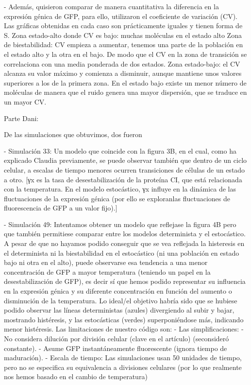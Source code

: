 - Además, quisieron comparar de manera cuantitativa la diferencia en la expresión génica de GFP, para ello, utilizaron el coeficiente de variación (CV). Las gráficas obtenidas en cada caso son prácticamente iguales y tienen forma de S. 
	Zona estado-alto donde CV es bajo: muchas moléculas en el estado alto 
	Zona de biestabilidad: CV empieza a aumentar, tenemos una parte de la población en el estado alto y la otra en el bajo. De modo que el CV en la zona de transición se correlaciona con una media ponderada de dos estados.
	Zona estado-bajo: el CV alcanza su valor máximo y comienza a disminuir, aunque mantiene unos valores superiores a los de la primera zona. En el estado bajo existe un menor número de moléculas de manera que el ruido genera una mayor dispersión, que se traduce en un mayor CV.


Parte Dani:

De las simulaciones que obtuvimos, dos fueron

- Simulación 33: Un modelo que coincide con la figura 3B, en el cual, como ha explicado Claudia previamente, se puede observar también que dentro de un ciclo celular, a escalas de tiempo menores ocurren transiciones de células de un estado a otro.
	[γx es la tasa de desestabilización de la proteína CI, que está relacionada con la temperatura. En el modelo estocástico, γx influye en la dinámica de las fluctuaciones de la expresión génica (por ello se exploranlas fluctuaciones de  fluorescencia de GFP a un valor fijo).]

- Simulación 49: Intentamos obtener un modelo que reflejase la figura 4B pero que también permitiese comparar entre los modelos determinista y el estocástico. A pesar de que no hayamos podido conseguir que se vea reflejada la histeresis en el determinista ni la biestabilidad en el estocástico (ni una población en estado bajo ni otra en el alto), puede observarse esa tendencia a una menor concentración de GFP a mayor temperatura (teniendo un papel en la desestabilización de GFP), es decir sí que hemos podido representar su influencia en la expresión génica y su diferente concentración en función del aumento o disminución de la temperatura. 
Lo ideal/el objetivo habría sido que se hubiese podido observar las líneas deterministas (azules) divergiendo al subir y bajar, mostrando histéresis, y las estocásticas (verdes) superponiéndose más, indicando menor histéresis. 
Las limitaciones de nuestro código son:
- Las simplificaciones: 
	- No considera dilución por división celular (clave en el artículo) (seconsideró constante). 
	- Asume GFP instantáneamente fluorescente (ignora tiempo de maduración). 
- Escala de tiempo: Las simulaciones usan 50 unidades de tiempo, pero no se especifica su equivalencia a divisiones celulares (por lo que realmente nos hemos basado en el cambio de temperatura)
	

